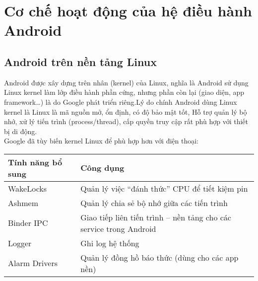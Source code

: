 \section{Cơ chế hoạt động của hệ điều hành Android}

\subsection{Android trên nền tảng Linux}
\renewcommand{\labelitemi}{--}    
\begin{flushleft}
    \hspace*{0.8cm}Android được xây dựng trên nhân (kernel) của Linux, nghĩa là Android sử dụng Linux kernel làm lớp điều hành phần cứng, nhưng phần còn lại (giao diện, app framework…) là do Google phát triển riêng.Lý do chính Android dùng Linux kernel là Linux là mã nguồn mở, ổn định, có độ bảo mật tốt, Hỗ trợ quản lý bộ nhớ, xử lý tiến trình (process/thread), cấp quyền truy cập rất phù hợp với thiết bị di động.\\
    Google đã tùy biến kernel Linux để phù hợp hơn với điện thoại:
    \begin{center}
        \renewcommand{\arraystretch}{1.5}
        \begin{tabular}{|l|p{11cm}|}
        \hline
        \textbf{Tính năng bổ sung } & \textbf{Công dụng
        } \\
        \hline
        WakeLocks & Quản lý việc “đánh thức” CPU để tiết kiệm pin        \\
        \hline
        Ashmem & Quản lý chia sẻ bộ nhớ giữa các tiến trình        \\
        \hline
        Binder IPC & Giao tiếp liên tiến trình – nền tảng cho các service trong Android        \\
        \hline
        Logger & Ghi log hệ thống        \\
        \hline
        Alarm Drivers & Quản lý đồng hồ báo thức (dùng cho các app nền) \\
        \hline
        \end{tabular}
        \end{center}  
\end{flushleft}


